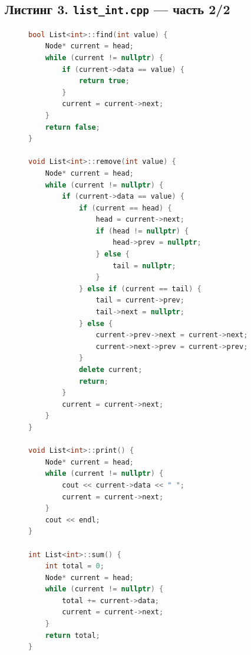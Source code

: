 \documentclass[a4paper, 14pt]{extarticle}
\begin{document}
\subsection*{Листинг 3. \texttt{list\_int.cpp} --- часть 2/2}
\begin{figure}[!htb]
\begin{lstlisting}[language=C++,caption={\texttt{List<int>} — реализация, строки 81–129},label={lst:list2b},firstnumber=81]
bool List<int>::find(int value) {
    Node* current = head;
    while (current != nullptr) {
        if (current->data == value) {
            return true;
        }
        current = current->next;
    }
    return false;
}

void List<int>::remove(int value) {
    Node* current = head;
    while (current != nullptr) {
        if (current->data == value) {
            if (current == head) {
                head = current->next;
                if (head != nullptr) {
                    head->prev = nullptr;
                } else {
                    tail = nullptr;
                }
            } else if (current == tail) {
                tail = current->prev;
                tail->next = nullptr;
            } else {
                current->prev->next = current->next;
                current->next->prev = current->prev;
            }
            delete current;
            return;
        }
        current = current->next;
    }
}

void List<int>::print() {
    Node* current = head;
    while (current != nullptr) {
        cout << current->data << " ";
        current = current->next;
    }
    cout << endl;
}

int List<int>::sum() {
    int total = 0;
    Node* current = head;
    while (current != nullptr) {
        total += current->data;
        current = current->next;
    }
    return total;
}
\end{lstlisting}
\end{figure}
\clearpage
\end{document}
